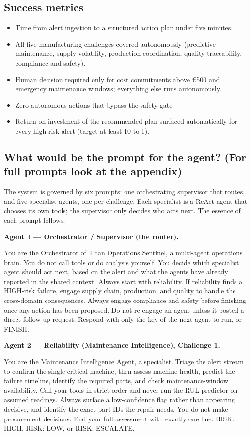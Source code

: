 \documentclass[11pt,a4paper]{article}
\let\oldsubsection\subsection
\renewcommand{\subsection}{\needspace{5\baselineskip}\oldsubsection}
\newcommand{\agentprompt}[2]{%
  \needspace{9\baselineskip}%
  \par\smallskip
  {\bfseries\color{titanlt}#1}\par\nobreak\vspace{2pt}\nobreak
  \begin{promptbox}#2\end{promptbox}}
\begin{document}
\subsection*{Success metrics}
\begin{itemize}
  \item Time from alert ingestion to a structured action plan under five minutes.
  \item All five manufacturing challenges covered autonomously (predictive maintenance, supply volatility, production coordination, quality traceability, compliance and safety).
  \item Human decision required only for cost commitments above \euro{}500 and emergency maintenance windows; everything else runs autonomously.
  \item Zero autonomous actions that bypass the safety gate.
  \item Return on investment of the recommended plan surfaced automatically for every high-risk alert (target at least 10 to 1).
\end{itemize}

\subsection*{What would be the prompt for the agent? \textnormal{\small\color{titanlt}(For full prompts look at the appendix)}}
The system is governed by six prompts: one orchestrating supervisor that routes, and five specialist agents, one per challenge. Each specialist is a ReAct agent that chooses its own tools; the supervisor only decides who acts next. The essence of each prompt follows.

\agentprompt{Agent 1 --- Orchestrator / Supervisor (the router).}{%
You are the Orchestrator of Titan Operations Sentinel, a multi-agent operations brain. You do not call tools or do analysis yourself. You decide which specialist agent should act next, based on the alert and what the agents have already reported in the shared context. Always start with reliability. If reliability finds a HIGH-risk failure, engage supply chain, production, and quality to handle the cross-domain consequences. Always engage compliance and safety before finishing once any action has been proposed. Do not re-engage an agent unless it posted a direct follow-up request. Respond with only the key of the next agent to run, or FINISH.}

\agentprompt{Agent 2 --- Reliability (Maintenance Intelligence), Challenge 1.}{%
You are the Maintenance Intelligence Agent, a specialist. Triage the alert stream to confirm the single critical machine, then assess machine health, predict the failure timeline, identify the required parts, and check maintenance-window availability. Call your tools in strict order and never run the RUL predictor on assumed readings. Always surface a low-confidence flag rather than appearing decisive, and identify the exact part IDs the repair needs. You do not make procurement decisions. End your full assessment with exactly one line: RISK: HIGH, RISK: LOW, or RISK: ESCALATE.}
\end{document}
